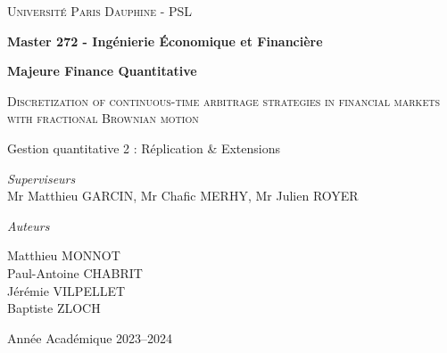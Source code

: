 \documentclass[12pt,a4paper]{article}
\begin{document}
\begin{titlepage}
	\centering
	{\LARGE \textsc{Université Paris Dauphine - PSL}\par}
	\vspace{1cm}
	{\Large\bfseries Master 272 - Ingénierie Économique et Financière \par}
    {\Large \bfseries Majeure Finance Quantitative \par}
    \vspace{1.5cm}
    {\LARGE \textsc{Discretization of continuous-time arbitrage strategies in financial markets with fractional Brownian motion}\par}
    \vspace{2cm}
	{\Large Gestion quantitative 2 : Réplication \& Extensions\par}     
    \vspace{1cm}
    \textit{Superviseurs} \\
    Mr Matthieu \textsc{GARCIN}, 
    Mr Chafic \textsc{MERHY}, 
    Mr Julien \textsc{ROYER}
	\vfill
 
	\textit{Auteurs}\par
 Matthieu \textsc{MONNOT} \\
 Paul-Antoine \textsc{CHABRIT} \\
 Jérémie \textsc{VILPELLET} \\
 Baptiste \textsc{ZLOCH}
    \vfill

	\vfill
	{\large  Année Académique 2023--2024\par}
\end{titlepage}


\newpage
\tableofcontents

\newpage
\end{document}
